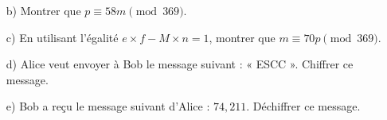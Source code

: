 {{\begin{enumerate}
\begin{enumerate}
        \item [b)] Montrer que \( p \equiv 58m \pmod{369} \).
        
        \item [c)] En utilisant l’égalité \( e \times f -  M \times n  = 1\), montrer que \( m \equiv 70p \pmod{369} \).
        
        \item [d)] Alice veut envoyer à Bob le message suivant : « ESCC ». Chiffrer ce message.
        
        \item [e)] Bob a reçu le message suivant d’Alice : \( \boxed{74}, \boxed{211} \). Déchiffrer ce message.
    \end{enumerate}
\end{enumerate}
}
}